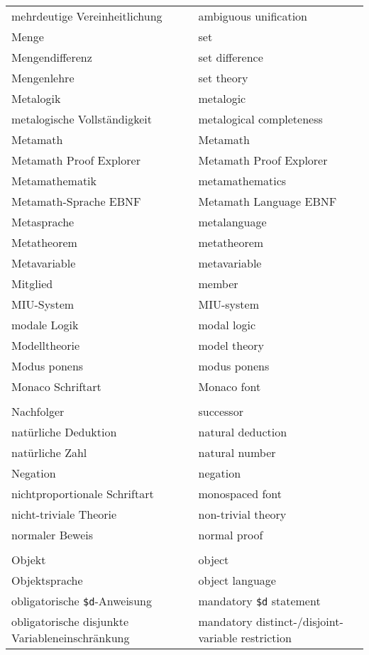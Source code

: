 \begin{longtabu}   { @{} X[l] X[l] }
    mehrdeutige Vereinheitlichung & ambiguous unification \\
    Menge & set \\
    Mengendifferenz & set difference \\
    Mengenlehre & set theory \\
    Metalogik & metalogic \\
    metalogische Vollständigkeit & metalogical completeness \\
    Metamath & Metamath \\
    Metamath Proof Explorer & Metamath Proof Explorer \\
    Metamathematik & metamathematics \\
    Metamath-Sprache EBNF & Metamath Language EBNF \\
    Metasprache & metalanguage \\
    Metatheorem & metatheorem \\
    Metavariable & metavariable \\
    Mitglied & member \\
    MIU-System & MIU-system \\
    modale Logik & modal logic \\
    Modelltheorie & model theory \\
    Modus ponens & modus ponens \\
    Monaco Schriftart & Monaco font \\
     & \\
    Nachfolger & successor \\
    natürliche Deduktion & natural deduction \\
    natürliche Zahl & natural number \\
    Negation & negation \\
    nichtproportionale Schriftart & monospaced font \\
    nicht-triviale Theorie & non-trivial theory \\
    normaler Beweis & normal proof \\
     & \\
    Objekt & object \\
    Objektsprache & object language \\
    obligatorische \texttt{\$d}-Anweisung & mandatory \texttt{\$d} statement \\
    \hangindent=0.5cm obligatorische disjunkte Variableneinschränkung & \hangindent=0.5cm mandatory distinct-/disjoint-{\allowbreak}variable restriction \\

\end{longtabu}
